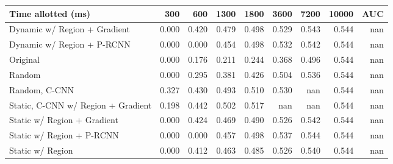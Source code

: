 \begin{tabular}{lrrrrrrrr}
\toprule
Time allotted (ms) &    300 &   600 &  1300 &  1800 &  3600 &  7200 &  10000 &  AUC \\
\midrule
Dynamic w/ Region + Gradient       & 0.000 & 0.420 & 0.479 & 0.498 & 0.529 & 0.543 &  0.544 &  nan \\
Dynamic w/ Region + P-RCNN       & 0.000 & 0.000 & 0.454 & 0.498 & 0.532 & 0.542 &  0.544 &  nan \\
Original                            & 0.000 & 0.176 & 0.211 & 0.244 & 0.368 & 0.496 &  0.544 &  nan \\
Random                           & 0.000 & 0.295 & 0.381 & 0.426 & 0.504 & 0.536 &  0.544 &  nan \\
Random, C-CNN                & 0.327 & 0.430 & 0.493 & 0.510 & 0.530 &   nan &  0.544 &  nan \\
Static, C-CNN w/ Region + Gradient  & 0.198 & 0.442 & 0.502 & 0.517 &   nan &   nan &  0.544 &  nan \\
Static w/ Region + Gradient        & 0.000 & 0.424 & 0.469 & 0.490 & 0.526 & 0.542 &  0.544 &  nan \\
Static w/ Region + P-RCNN           & 0.000 & 0.000 & 0.457 & 0.498 & 0.537 & 0.544 &  0.544 &  nan \\
Static w/ Region                    & 0.000 & 0.412 & 0.463 & 0.485 & 0.526 & 0.540 &  0.544 &  nan \\
\bottomrule
\end{tabular}
